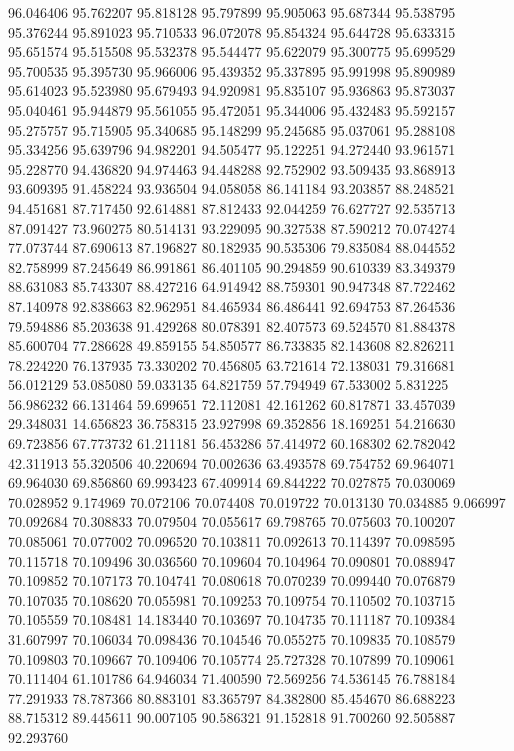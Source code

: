 96.046406
95.762207
95.818128
95.797899
95.905063
95.687344
95.538795
95.376244
95.891023
95.710533
96.072078
95.854324
95.644728
95.633315
95.651574
95.515508
95.532378
95.544477
95.622079
95.300775
95.699529
95.700535
95.395730
95.966006
95.439352
95.337895
95.991998
95.890989
95.614023
95.523980
95.679493
94.920981
95.835107
95.936863
95.873037
95.040461
95.944879
95.561055
95.472051
95.344006
95.432483
95.592157
95.275757
95.715905
95.340685
95.148299
95.245685
95.037061
95.288108
95.334256
95.639796
94.982201
94.505477
95.122251
94.272440
93.961571
95.228770
94.436820
94.974463
94.448288
92.752902
93.509435
93.868913
93.609395
91.458224
93.936504
94.058058
86.141184
93.203857
88.248521
94.451681
87.717450
92.614881
87.812433
92.044259
76.627727
92.535713
87.091427
73.960275
80.514131
93.229095
90.327538
87.590212
70.074274
77.073744
87.690613
87.196827
80.182935
90.535306
79.835084
88.044552
82.758999
87.245649
86.991861
86.401105
90.294859
90.610339
83.349379
88.631083
85.743307
88.427216
64.914942
88.759301
90.947348
87.722462
87.140978
92.838663
82.962951
84.465934
86.486441
92.694753
87.264536
79.594886
85.203638
91.429268
80.078391
82.407573
69.524570
81.884378
85.600704
77.286628
49.859155
54.850577
86.733835
82.143608
82.826211
78.224220
76.137935
73.330202
70.456805
63.721614
72.138031
79.316681
56.012129
53.085080
59.033135
64.821759
57.794949
67.533002
5.831225
56.986232
66.131464
59.699651
72.112081
42.161262
60.817871
33.457039
29.348031
14.656823
36.758315
23.927998
69.352856
18.169251
54.216630
69.723856
67.773732
61.211181
56.453286
57.414972
60.168302
62.782042
42.311913
55.320506
40.220694
70.002636
63.493578
69.754752
69.964071
69.964030
69.856860
69.993423
67.409914
69.844222
70.027875
70.030069
70.028952
9.174969
70.072106
70.074408
70.019722
70.013130
70.034885
9.066997
70.092684
70.308833
70.079504
70.055617
69.798765
70.075603
70.100207
70.085061
70.077002
70.096520
70.103811
70.092613
70.114397
70.098595
70.115718
70.109496
30.036560
70.109604
70.104964
70.090801
70.088947
70.109852
70.107173
70.104741
70.080618
70.070239
70.099440
70.076879
70.107035
70.108620
70.055981
70.109253
70.109754
70.110502
70.103715
70.105559
70.108481
14.183440
70.103697
70.104735
70.111187
70.109384
31.607997
70.106034
70.098436
70.104546
70.055275
70.109835
70.108579
70.109803
70.109667
70.109406
70.105774
25.727328
70.107899
70.109061
70.111404
61.101786
64.946034
71.400590
72.569256
74.536145
76.788184
77.291933
78.787366
80.883101
83.365797
84.382800
85.454670
86.688223
88.715312
89.445611
90.007105
90.586321
91.152818
91.700260
92.505887
92.293760
